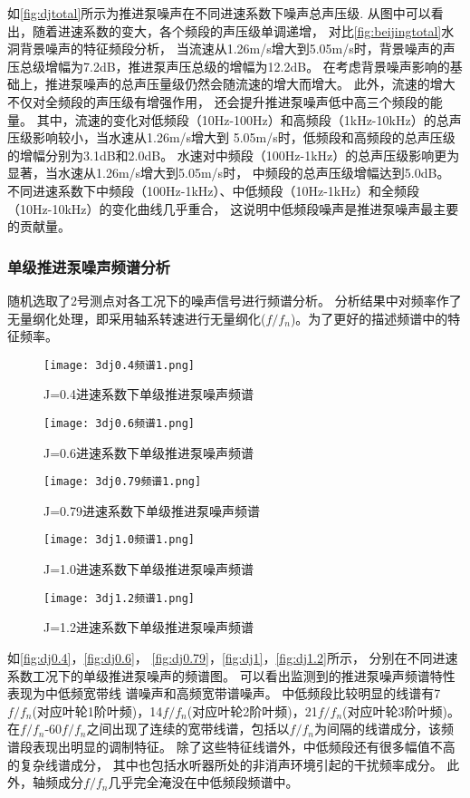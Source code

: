 如\autoref{fig:djtotal}所示为推进泵噪声在不同进速系数下噪声总声压级.
从图中可以看出，随着进速系数的变大，各个频段的声压级单调递增，
对比\autoref{fig:beijingtotal}水洞背景噪声的特征频段分析，
当流速从1.26m/s增大到5.05m/s时，背景噪声的声压总级增幅为7.2dB，推进泵声压总级的增幅为12.2dB。
在考虑背景噪声影响的基础上，推进泵噪声的总声压量级仍然会随流速的增大而增大。
此外，流速的增大不仅对全频段的声压级有增强作用，
还会提升推进泵噪声低中高三个频段的能量。
其中，流速的变化对低频段（10Hz-100Hz）和高频段（1kHz-10kHz）的总声压级影响较小，当水速从1.26m/s增大到
5.05m/s时，低频段和高频段的总声压级的增幅分别为3.1dB和2.0dB。
水速对中频段（100Hz-1kHz）的总声压级影响更为显著，当水速从1.26m/s增大到5.05m/s时，
中频段的总声压级增幅达到5.0dB。
不同进速系数下中频段（100Hz-1kHz）、中低频段（10Hz-1kHz）和全频段（10Hz-10kHz）的变化曲线几乎重合，
这说明中低频段噪声是推进泵噪声最主要的贡献量。
\subsubsection{单级推进泵噪声频谱分析}
随机选取了2号测点对各工况下的噪声信号进行频谱分析。
分析结果中对频率作了无量纲化处理，即采用轴系转速进行无量纲化($f/f_n$)。为了更好的描述频谱中的特征频率。
\begin{figure}[htbp]
    \centering
    \texttt{[image: 3dj0.4频谱1.png]}
    \caption{\label{fig:dj0.4}J=0.4进速系数下单级推进泵噪声频谱}
\end{figure}
\begin{figure}[htbp]
    \centering
    \texttt{[image: 3dj0.6频谱1.png]}
    \caption{\label{fig:dj0.6}J=0.6进速系数下单级推进泵噪声频谱}
\end{figure}
\begin{figure}[htbp]
    \centering
    \texttt{[image: 3dj0.79频谱1.png]}
    \caption{\label{fig:dj0.79}J=0.79进速系数下单级推进泵噪声频谱}
\end{figure}
\begin{figure}[htbp]
    \centering
    \texttt{[image: 3dj1.0频谱1.png]}
    \caption{\label{fig:dj1}J=1.0进速系数下单级推进泵噪声频谱}
\end{figure}
\begin{figure}[htbp]
    \centering
    \texttt{[image: 3dj1.2频谱1.png]}
    \caption{\label{fig:dj1.2}J=1.2进速系数下单级推进泵噪声频谱}
\end{figure}

如\autoref{fig:dj0.4}，\autoref{fig:dj0.6}，
\autoref{fig:dj0.79}，\autoref{fig:dj1}，\autoref{fig:dj1.2}所示，
分别在不同进速系数工况下的单级推进泵噪声的频谱图。
可以看出监测到的推进泵噪声频谱特性表现为中低频宽带线
谱噪声和高频宽带谱噪声。
中低频段比较明显的线谱有7$f/f_n$(对应叶轮1阶叶频)，14$f/f_n$(对应叶轮2阶叶频)，21$f/f_n$(对应叶轮3阶叶频)。
在$f/f_n$-60$f/f_n$之间出现了连续的宽带线谱，包括以$f/f_n$为间隔的线谱成分，该频谱段表现出明显的调制特征。
除了这些特征线谱外，中低频段还有很多幅值不高的复杂线谱成分，
其中也包括水听器所处的非消声环境引起的干扰频率成分。
此外，轴频成分$f/f_n$几乎完全淹没在中低频段频谱中。

